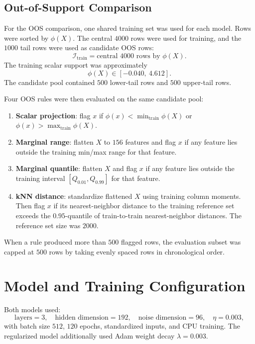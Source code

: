 \documentclass[11pt]{article}
\begin{document}
\subsection{Out-of-Support Comparison}

For the OOS comparison, one shared training set was used for each model.  Rows
were sorted by \(\phi(X)\).  The central \(4000\) rows were used for training,
and the \(1000\) tail rows were used as candidate OOS rows:
\[
  \mathcal{I}_{\mathrm{train}}
  =
  \text{central }4000\text{ rows by }\phi(X).
\]
The training scalar support was approximately
\[
  \phi(X)\in[-0.040,\ 4.612].
\]
The candidate pool contained \(500\) lower-tail rows and \(500\) upper-tail rows.

Four OOS rules were then evaluated on the same candidate pool:

\begin{enumerate}
  \item \textbf{Scalar projection}: flag \(x\) if
  \(\phi(x)<\min_{\mathrm{train}}\phi(X)\) or
  \(\phi(x)>\max_{\mathrm{train}}\phi(X)\).
  \item \textbf{Marginal range}: flatten \(X\) to \(156\) features and flag
  \(x\) if any feature lies outside the training min/max range for that
  feature.
  \item \textbf{Marginal quantile}: flatten \(X\) and flag \(x\) if any feature
  lies outside the training interval
  \([Q_{0.01}, Q_{0.99}]\) for that feature.
  \item \textbf{kNN distance}: standardize flattened \(X\) using training
  column moments.  Then flag \(x\) if its nearest-neighbor distance to the
  training reference set exceeds the \(0.95\)-quantile of train-to-train
  nearest-neighbor distances.  The reference set size was \(2000\).
\end{enumerate}

When a rule produced more than \(500\) flagged rows, the evaluation subset was
capped at \(500\) rows by taking evenly spaced rows in chronological order.

\section{Model and Training Configuration}

Both models used:
\[
\text{layers}=3,\quad
\text{hidden dimension}=192,\quad
\text{noise dimension}=96,\quad
\eta=0.003,
\]
with batch size \(512\), \(120\) epochs, standardized inputs, and CPU training.
The regularized model additionally used Adam weight decay \(\lambda=0.003\).
\end{document}
